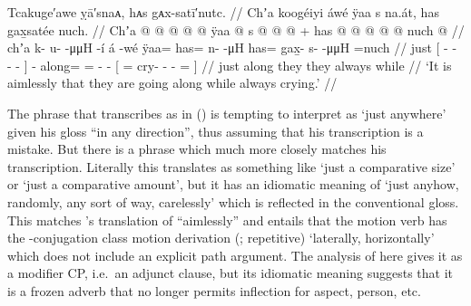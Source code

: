 \ex\label{ex:92-59-going-anywhere-crying}%
%
\begingl
	\glpreamble	Tcakuge′awe ỵā′snaᴀ, hᴀs gᴀx-satī′nutc. //
	\glpreamble	Chʼa koogéiyi áwé ÿaa s na.át, has gax̱satée nuch. //
	\gla	Chʼa {}  @ {} @ {} @ {} @ {} {}
		 @ {}
		ÿaa @ s @  @ {} @ {} +
		{} has @  @ {} @ {} @ {} @ \•nuch @ {} {} //
	\glb	chʼa {} k- u-  -μμH -í {}
		á -wé
		ÿaa= has= n-  -μH
		{} has= gax̱- s-  -μμH =nuch {} {} //
	\glc	just {}[ - -  - - {}]
		 -
		along= = -  -
		{}[ = cry- -
			 - = \· {}] //
	\gld	just {}  {} {} {} {} {}
		 {}
		along\• they  {} {}
		{} they  {} {} {} \•always \·while {} //
	\glft	‘It is aimlessly that they are going along while always crying.’
		//
\endgl
\xe

The phrase that \citeauthor{swanton:1909} transcribes as  in (\lastx) is tempting to interpret as  ‘just anywhere’ given his gloss “in any direction”, thus assuming that his transcription is a mistake.
But there is a phrase  which much more closely matches his transcription.
Literally this translates as something like ‘just a comparative size’ or ‘just a comparative amount’, but it has an idiomatic meaning of ‘just anyhow, randomly, any sort of way, carelessly’ which is reflected in the conventional gloss.
This matches \citeauthor{swanton:1909}’s translation of “aimlessly” and entails that the motion verb has the -conjugation class motion derivation (;  repetitive) ‘laterally, horizontally’ which does not include an explicit path argument.
The analysis of  here gives it as a modifier CP, i.e.\ an adjunct clause, but its idiomatic meaning suggests that it is a frozen adverb that no longer permits inflection for aspect, person, etc.

